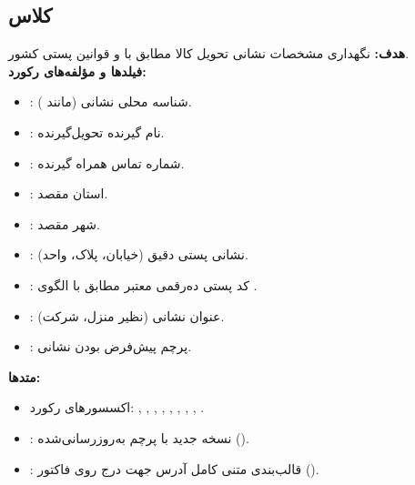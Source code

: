 \documentclass[11pt,a4paper]{article}
\begin{document}
\subsection{کلاس  }
\textbf{هدف:} نگهداری مشخصات نشانی تحویل کالا مطابق با  و قوانین پستی کشور.\\
\textbf{فیلدها و مؤلفه‌های رکورد:}
\begin{itemize}
    \item {}: شناسه محلی نشانی (مانند ).
    \item {}: نام گیرنده تحویل‌گیرنده.
    \item {}: شماره تماس همراه گیرنده.
    \item {}: استان مقصد.
    \item {}: شهر مقصد.
    \item {}: نشانی پستی دقیق (خیابان، پلاک، واحد).
    \item {}: کد پستی ده‌رقمی معتبر مطابق با الگوی .
    \item {}: عنوان نشانی (نظیر منزل، شرکت).
    \item {}: پرچم پیش‌فرض بودن نشانی.
\end{itemize}
\textbf{متدها:}
\begin{itemize}
    \item اکسسورهای رکورد: , , , , , , , , .
    \item {}: نسخه جدید با پرچم به‌روزرسانی‌شده ().
    \item {}: قالب‌بندی متنی کامل آدرس جهت درج روی فاکتور ().
\end{itemize}

\end{document}
